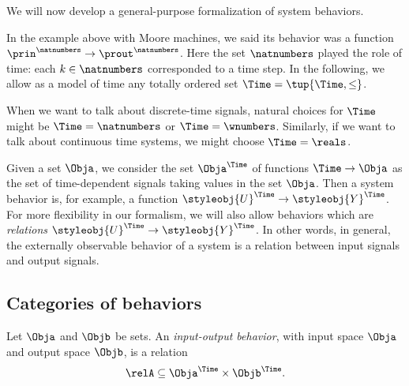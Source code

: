 We will now develop a general-purpose formalization of system behaviors. 


In the example above with Moore machines, we said its behavior was a function $\prin^\natnumbers \to \prout^\natnumbers$. Here the set $\natnumbers$ played the role of time: each $k \in \natnumbers$ corresponded to a time step. In the following, we allow as a model of time any totally ordered set $\Time = \tup{\Time, \leq}$. 

When we want to talk about discrete-time signals, natural choices for $\Time$ might be $\Time = \natnumbers$ or $\Time = \wnumbers$. Similarly, if we want to talk about continuous time systems, we might choose $\Time = \reals$.


Given a set $\Obja$, we consider the set $\Obja^\Time$ of functions $\Time \to \Obja$ as the set of time-dependent signals taking values in the set $\Obja$. Then a system behavior is, for example, a function $\styleobj{U}^\Time \to \styleobj{Y}^\Time$. For more flexibility in our formalism, we will also allow behaviors which are \emph{relations} $\styleobj{U}^\Time \to \styleobj{Y}^\Time$. 
In other words, in general, the externally observable behavior of a system is a relation between input signals and output signals.



\subsection{Categories of behaviors}

 
\begin{definition}
    Let $\Obja$ and $\Objb$ be sets.
    An \emph{input-output behavior}, with input space $\Obja$ and output space $\Objb$, is a relation
    \begin{equation}
        \relA \subseteq \Obja^\Time \times \Objb^\Time.
    \end{equation}
\end{definition}

